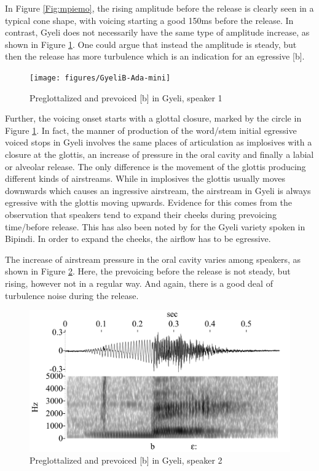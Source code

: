 In Figure \ref{Fig:mpiemo}, the rising amplitude before the release is clearly seen in a typical cone shape, with voicing starting a good 150ms before the release. In contrast, Gyeli does not necessarily have the same type of amplitude increase, as shown in Figure \ref{Fig:Implb}. One could argue that instead the amplitude is steady, but then the release has more turbulence which is an indication for an egressive [b]. 


\begin{figure} 
\centering
\texttt{[image: figures/GyeliB-Ada-mini]}
\caption{Preglottalized and prevoiced [b] in Gyeli, speaker 1}
\label{Fig:Implb}
\end{figure}

Further,  the voicing onset starts with a glottal closure, marked by the circle in Figure \ref{Fig:Implb}. In fact, the manner of production of the word/stem initial egressive voiced stops in Gyeli involves the same places of articulation as implosives with a closure at the glottis, an increase of pressure in the oral cavity and finally a labial or alveolar release. The only difference is the movement of the glottis producing different kinds of airstreams. While in implosives the glottis usually moves downwards which causes an ingressive airstream, the airstream in Gyeli is always egressive with the glottis moving upwards. Evidence for this comes from the observation that speakers tend to expand their cheeks during prevoicing time/before release. This has also been noted by \citet{renaud76} for the Gyeli variety spoken in Bipindi. In order to expand the cheeks, the airflow has to be egressive.

The increase of airstream pressure in the oral cavity varies among speakers, as shown in Figure \ref{Fig:ImplbMama}. Here, the prevoicing before the release is not steady, but rising, however not in a regular way. And again, there is a good deal of turbulence noise during the release.


\begin{figure} 
\centering
\includegraphics[width=\textwidth]{figures/GyeliB-Mama-mini}
\caption{Preglottalized and prevoiced [b] in Gyeli, speaker 2}
\label{Fig:ImplbMama}
\end{figure}

